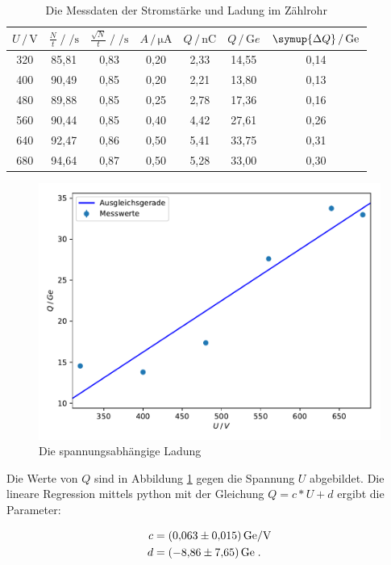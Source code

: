   \begin{table}
    \centering
    \caption{Die Messdaten der Stromstärke und Ladung im Zählrohr}
    \label{tab:mess3}
    \begin{tabular}{c c c c c c c}
    \toprule
    $U \,/\, \si{\volt}$ & $\frac{N}{t} \;/\; \si{\per\second}$
    & $\frac{\sqrt{N}}{t} \;/\; \si{\per\second}$ & $A \,/\, \si{\micro\ampere}$
    & $Q \,/\, \si{\nano\coulomb}$ & $Q \,/\, \si{\giga e}$ & 
    $\symup{\Delta Q} \,/\, \si{\giga e}$\\
    \midrule 
    320 & 85,81 & 0,83 & 0,20 & 2,33 & 14,55 & 0,14 \\
    400 & 90,49 & 0,85 & 0,20 & 2,21 & 13,80 & 0,13 \\
    480 & 89,88 & 0,85 & 0,25 & 2,78 & 17,36 & 0,16 \\
    560 & 90,44 & 0,85 & 0,40 & 4,42 & 27,61 & 0,26 \\
    640 & 92,47 & 0,86 & 0,50 & 5,41 & 33,75 & 0,31 \\
    680 & 94,64 & 0,87 & 0,50 & 5,28 & 33,00 & 0,30 \\
    \bottomrule
    \end{tabular}
    \end{table}

    \begin{figure}
      \centering
      \includegraphics{content/plot2.pdf}
      \caption{Die spannungsabhängige Ladung}
      \label{fig:plot2}
    \end{figure}

    Die Werte von $Q$ sind in Abbildung \ref{fig:plot2} gegen die Spannung $U$
    abgebildet. Die lineare Regression mittels python mit der
    Gleichung $Q = c * U + d$ ergibt die Parameter: 

    \begin{align*}
      c &= \SI{0.063 +- 0.015}{\giga e \per\volt} \\
      d &= \SI{-8.86 +- 7.65}{\giga e}   \;.
    \end{align*}








